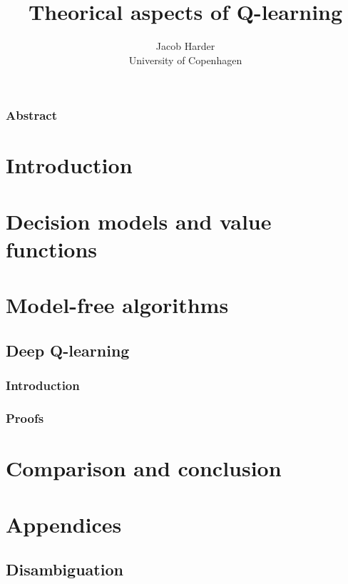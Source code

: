 \documentclass{report}
\title{Theorical aspects of Q-learning}
\author{Jacob Harder \\ University of Copenhagen}
\begin{document}


\subsection*{Abstract}


\newpage
\renewcommand{\baselinestretch}{1.0}\normalsize
\tableofcontents
\renewcommand{\baselinestretch}{1.3}\normalsize

\newpage
\chapter{Introduction}

%
\chapter{Decision models and value functions}


\chapter{Model-free algorithms}


\section{Deep Q-learning}
\subsection{Introduction}

\subsection{Proofs}


\chapter{Comparison and conclusion}

\setcounter{chapter}{0}%
\renewcommand{\thechapter}{\Alph{chapter}}%
\chapter{Appendices}

\newpage
\section{Disambiguation}

\newpage
{}
\end{document}
